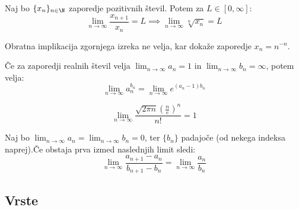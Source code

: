 \documentclass[12pt, a4paper, unicode]{article}
\begin{document}
\begin{izrek}
Naj bo $\{x_n\}_{n \in \N}$ zaporedje pozitivnih števil. Potem za $L \in [0, \infty]$:
$$\lim_{n \to \infty} \frac{x_{n+1}}{x_n} = L \implies \lim_{n \to \infty} \sqrt[n]{x_n} = L$$
\end{izrek}

Obratna implikacija zgornjega izreka ne velja, kar dokaže zaporedje $x_n = n^{-n}$.

\begin{izrek}
Če za zaporedji realnih števil velja $\lim_{n \to \infty}a_n = 1$ in $\lim_{n \to \infty}b_n = \infty$, potem velja: $$\lim_{n \to \infty}a_n^{b_n} = \lim_{n \to \infty}e^{(a_n - 1)b_n}$$
\end{izrek}

\begin{izrek}
$$\lim_{n \to \infty} \frac{\sqrt{2 \pi n} \left( \frac{n}{e}\right)^n}{n!} = 1$$    
\end{izrek}

\begin{izrek}
Naj bo $\lim_{n \to \infty} a_n = \lim_{n \to \infty} b_n = 0$, ter $\{b_n\}$ padajoče (od nekega indeksa naprej).\footnotemark \newline Če obstaja prva izmed naslednjih limit sledi:
$$\lim_{n \to \infty} \frac{a_{n+1} - a_n}{b_{n+1} - b_n} = \lim_{n \to \infty} \frac{a_n}{b_n}$$
\end{izrek}


\newpage
\subsection{Vrste}
\end{document}
